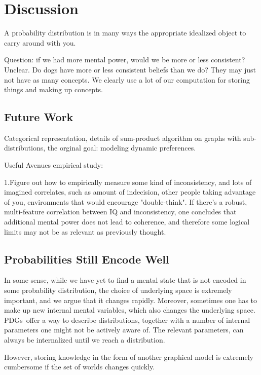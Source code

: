 \documentclass{article}
\newcommand{\MN}{PDG}
\newcommand{\MNs}{\MN s}
\begin{document}
	\section{Discussion}
	
	
	A probability distribution is in many ways the appropriate idealized object to carry around with you.
	
	Question: if we had more mental power, would we be more or less consistent? Unclear. Do dogs have more or less consistent beliefs than we do? They may just not have as many concepts. We clearly use a lot of our computation for storing things and making up concepts.
	
	
	\subsection{Future Work}
	Categorical representation, details of sum-product algorithm on graphs with sub-distributions, the orginal goal: modeling dynamic preferences.
	
	Useful Avenues empirical study: 
	
	1.Figure out how to empirically measure some kind of inconsistency, and lots of imagined correlates, such as amount of indecision, other people taking advantage of you, environments that would encourage "double-think". If there's a robust, multi-feature correlation between IQ and inconsistency, one concludes that additional mental power does not lead to coherence, and therefore some logical limits may not be as relevant as previously thought.
	
	
	

	\subsection{Probabilities Still Encode Well}	
	In some sense, while we have yet to find a mental state that is not encoded in some probability distribution, the choice of underlying space is extremely important, and we argue that it changes rapidly. Moreover, sometimes one has to make up new internal mental variables, which also changes the underlying space. \MNs\ offer a way to describe distributions, together with a number of internal parameters one might not be actively aware of. The relevant parameters, can always be internalized  until we reach a distribution. 
	
	However, storing knowledge in the form of another graphical model is extremely cumbersome if the set of worlds changes quickly.	
\end{document}
